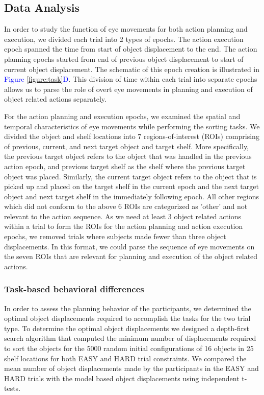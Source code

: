 \subsection{Data Analysis}\label{sec:data_analysis}

In order to study the function of eye movements for both action planning and execution, we divided each trial into 2 types of epochs. The action execution epoch spanned the time from start of object displacement to the end. The action planning epochs started from end of previous object displacement to start of current object displacement. The schematic of this epoch creation is illustrated in \textcolor{Blue}{Figure \ref{figure:task}D}. This division of time within each trial into separate epochs allows us to parse the role of overt eye movements in planning and execution of object related actions separately.

For the action planning and execution epochs, we examined the spatial and temporal characteristics of eye movements while performing the sorting tasks. We divided the object and shelf locations into 7 regions-of-interest (ROIs) comprising of previous, current, and next target object and target shelf. More specifically, the previous target object refers to the object that was handled in the previous action epoch, and previous target shelf as the shelf where the previous target object was placed. Similarly, the current target object refers to the object that is picked up and placed on the target shelf in the current epoch and the next target object and next target shelf in the immediately following epoch. All other regions which did not conform to the above 6 ROIs are categorized as 'other' and not relevant to the action sequence.  As we need at least 3 object related actions within a trial to form the ROIs for the action planning and action execution epochs, we removed trials where subjects made fewer than three object displacements. In this format, we could parse the sequence of eye movements on the seven ROIs that are relevant for planning and execution of the object related actions. 


\subsubsection{Task-based behavioral differences}\label{sec:behavior}

In order to assess the planning behavior of the participants, we determined the optimal object displacements required to accomplish the tasks for the two trial type. To determine the optimal object displacements we designed a depth-first search algorithm that computed the minimum number of displacements required to sort the objects for the 5000 random initial configurations of 16 objects in 25 shelf locations for both EASY and HARD trial constraints. We compared the mean number of object displacements made by the participants in the EASY and HARD trials with the model based object displacements using independent t-tests.


